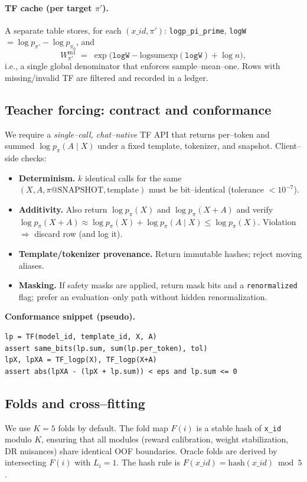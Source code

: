 \paragraph{TF cache (per target $\pi'$).}
A separate table stores, for each $(x\_id,\pi')$: \texttt{logp\_pi\_prime}, \texttt{logW}$=\log p_{\pi'}-\log p_{\pi_0}$, and
\[
W^{\mathrm{m1}}_{\pi'} \;=\; \exp\!\Big(\texttt{logW} - \mathrm{logsumexp}(\texttt{logW}) + \log n\Big),
\]
i.e., a single global denominator that enforces sample–mean–one. Rows with missing/invalid TF are filtered and recorded in a ledger.

\subsection{Teacher forcing: contract and conformance}
\label{app:impl-tf}
We require a \emph{single–call, chat–native} TF API that returns per–token and summed $\log p_\pi(A\!\mid\!X)$ under a fixed template, tokenizer, and snapshot. Client–side checks:

\begin{itemize}[leftmargin=*,itemsep=2pt,topsep=2pt]
\item \textbf{Determinism.} $k$ identical calls for the same $(X,A,\pi@\text{SNAPSHOT},\text{template})$ must be bit–identical (tolerance $<10^{-7}$).
\item \textbf{Additivity.} Also return $\log p_\pi(X)$ and $\log p_\pi(X{+}A)$ and verify
$\log p_\pi(X{+}A)\approx \log p_\pi(X)+\log p_\pi(A\!\mid\!X)\le \log p_\pi(X)$.
Violation $\Rightarrow$ discard row (and log it).
\item \textbf{Template/tokenizer provenance.} Return immutable hashes; reject moving aliases.
\item \textbf{Masking.} If safety masks are applied, return mask bits and a \texttt{renormalized} flag; prefer an evaluation–only path without hidden renormalization.
\end{itemize}

\noindent\textbf{Conformance snippet (pseudo).}
\begin{verbatim}
lp = TF(model_id, template_id, X, A)
assert same_bits(lp.sum, sum(lp.per_token), tol)
lpX, lpXA = TF_logp(X), TF_logp(X+A)
assert abs(lpXA - (lpX + lp.sum)) < eps and lp.sum <= 0
\end{verbatim}

\subsection{Folds and cross–fitting}
\label{app:impl-folds}
We use $K{=}5$ folds by default. The fold map $F(i)$ is a stable hash of \texttt{x\_id} modulo $K$, ensuring that all modules (reward calibration, weight stabilization, DR nuisances) share identical OOF boundaries. Oracle folds are derived by intersecting $F(i)$ with $L_i{=}1$. The hash rule is $F(x\_id){=}\mathrm{hash}(x\_id)\bmod 5$.

